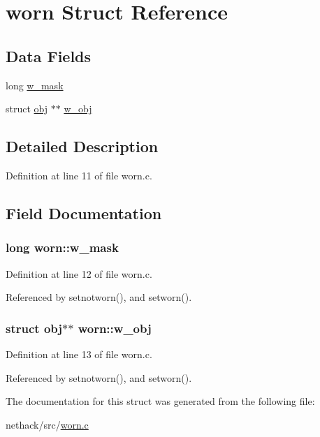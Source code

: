 \hypertarget{structworn}{\section{worn Struct Reference}
\label{structworn}
}
\subsection*{Data Fields}
\begin{DoxyCompactItemize}
\item 
long \hyperlink{structworn_ae7561ee72a51ddfe0e5a093e3b3eb645}{w\+\_\+mask}
\item 
struct \hyperlink{structobj}{obj} $\ast$$\ast$ \hyperlink{structworn_a630486081e658e9550c99e01e2779046}{w\+\_\+obj}
\end{DoxyCompactItemize}


\subsection{Detailed Description}


Definition at line 11 of file worn.\+c.



\subsection{Field Documentation}
\hypertarget{structworn_ae7561ee72a51ddfe0e5a093e3b3eb645}{
\subsubsection[{w\+\_\+mask}]{\setlength{\rightskip}{0pt plus 5cm}long worn\+::w\+\_\+mask}}\label{structworn_ae7561ee72a51ddfe0e5a093e3b3eb645}


Definition at line 12 of file worn.\+c.



Referenced by setnotworn(), and setworn().

\hypertarget{structworn_a630486081e658e9550c99e01e2779046}{
\subsubsection[{w\+\_\+obj}]{\setlength{\rightskip}{0pt plus 5cm}struct {\bf obj}$\ast$$\ast$ worn\+::w\+\_\+obj}}\label{structworn_a630486081e658e9550c99e01e2779046}


Definition at line 13 of file worn.\+c.



Referenced by setnotworn(), and setworn().



The documentation for this struct was generated from the following file\+:\begin{DoxyCompactItemize}
\item 
nethack/src/\hyperlink{worn_8c}{worn.\+c}\end{DoxyCompactItemize}
